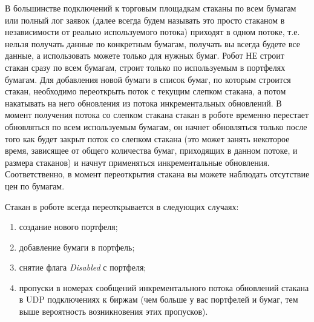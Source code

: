 \label{orderbook}

В большинстве подключений к торговым площадкам стаканы по всем бумагам или полный лог заявок (далее всегда будем называть это просто стаканом в независимости от
реально используемого потока) приходят в одном потоке, т.е. нельзя получать данные по конкретным бумагам, получать вы всегда будете все данные, а использовать можете
только для нужных бумаг. Робот НЕ строит стакан сразу по всем бумагам, строит только по используемым в портфелях бумагам. Для добавления новой бумаги в список бумаг,
по которым строится стакан, необходимо переоткрыть поток с текущим слепком стакана, а потом накатывать на него обновления из потока инкрементальных обновлений. В
момент получения потока со слепком стакана стакан в роботе временно перестает обновляться по всем используемым бумагам, он начнет обновляться только после того как
будет закрыт поток со слепком стакана (это может занять некоторое время, зависящее от общего количества бумаг, приходящих в данном потоке, и размера стаканов) и начнут
применяться инкрементальные обновления. Соответственно, в момент переоткрытия стакана вы можете наблюдать отсутствие цен по бумагам.

Стакан в роботе всегда переоткрывается в следующих случаях:
\begin{enumerate}
	\item создание нового портфеля;
	\item добавление бумаги в портфель;
	\item снятие флага \textit{Disabled} с портфеля;
	\item пропуски в номерах сообщений инкрементального потока обновлений стакана в UDP подключениях к биржам (чем больше у вас портфелей и бумаг, тем выше
		вероятность возникновения этих пропусков).
\end{enumerate}

\label{problems}

